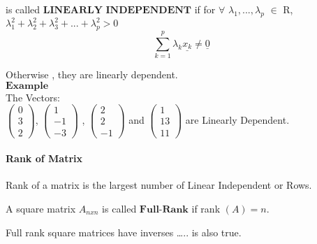 \documentclass[]{article}
\let\oldparagraph\paragraph
\renewcommand{\paragraph}[1]{\oldparagraph{#1}\mbox{}}
\begin{document}
is called \(\textbf{LINEARLY INDEPENDENT}\) if for \(\forall\)
\(\lambda_1,...,\lambda_p\) \(\in\) R,
\(\lambda^2_1+\lambda^2_2+\lambda^2_3+...+\lambda^2_p > 0\)\\

\[\sum\limits_{k=1}^p \lambda_k \underline{x_k} \neq \underline{0}\]

Otherwise , they are linearly dependent.\\

\(\mathbf{Example}\)\\
 The Vectors:\\
 \(\begin{pmatrix} 0\\ 3\\2 \end{pmatrix}\),
\(\begin{pmatrix} 1\\ -1\\-3 \end{pmatrix}\) ,
\(\begin{pmatrix} 2\\ 2\\-1 \end{pmatrix}\) and
\(\begin{pmatrix} 1\\ 13\\11 \end{pmatrix}\) are Linearly Dependent.

\paragraph{\texorpdfstring{Rank of Matrix\\
}{Rank of Matrix }}\label{rank-of-matrix}

\begin{tcolorbox}[colback=green!5,colframe=red!40!black,title=Definition]
Rank of a matrix is the largest number of Linear Independent or Rows. 



\end{tcolorbox}

\begin{tcolorbox}[colback=green!5,colframe=red!40!black,title=Definition]
A square matrix $A_{nxn}$ is called $\textbf{Full-Rank}$ if rank $(A)=n$.



\end{tcolorbox}

Full rank square matrices have inverses \ldots{}.. is also true.
\end{document}
